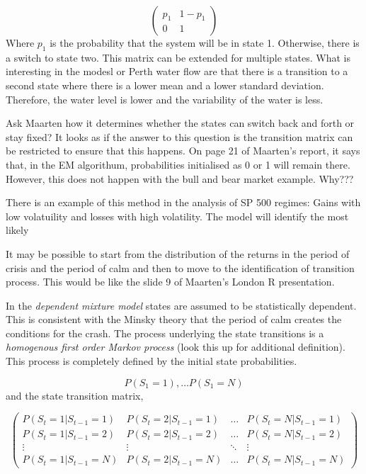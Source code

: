 \documentclass[12pt, a4paper, oneside]{article} %
\begin{document}
\begin{equation*}
\begin{pmatrix}
p_1 & 1 - p_1 \\
0 & 1
\end{pmatrix}
\end{equation*}
Where $p_1$ is the probability that the system will be in state 1.  Otherwise, there is a switch to state two.  This matrix can be extended for multiple states. What is interesting in the modesl or Perth water flow are that there is a transition to a second state where there is a lower mean and a lower standard deviation. Therefore, the water level is lower and the variability of the water is less. 

Ask Maarten how it determines whether the states can switch back and forth or stay fixed?  It looks as if the answer to this question is the transition matrix can be restricted to ensure that this happens.  On page 21 of Maarten's report, it says that, in the EM algorithum, probabilities initialised as 0 or 1 will remain there.  However, this does not happen with the bull and bear market example.  Why???

There is an example of this method in the analysis of SP 500 regimes: Gains with low volatuility and losses with high volatility. The model will identify the most likely 

It may be possible to start from the distribution of the returns in the period of crisis and the period of calm and then to move to the identification of transition process.  This would be like the slide 9 of Maarten's London R presentation. 

In the \emph{dependent mixture model} states are assumed to be statistically dependent.  This is consistent with the Minsky theory that the period of calm creates the conditions for the crash. The process underlying the state transitions is a \emph{homogenous first order Markov process}  (look this up for additional definition).  This process is completely defined by the initial state probabilities.  

\begin{equation*}
P(S_1 = 1), \dots P(S_1 = N)
\end{equation*}
and the state transition matrix, 

\begin{equation*}
\begin{pmatrix}
P(S_t = 1|S_{t-1}=1) & P(S_t = 2|S_{t-1}=1) & \dots & P(S_t = N|S_{t-1}=1)\\
P(S_t = 1|S_{t-1}=2) & P(S_t = 2|S_{t-1}=2) & \dots & P(S_t = N|S_{t-1}=2)\\
\vdots & \vdots & \ddots & \vdots \\
P(S_t = 1|S_{t-1}=N) & P(S_t = 2|S_{t-1}=N) & \dots & P(S_t = N|S_{t-1}=N)
\end{pmatrix}
\end{equation*}
\end{document}
